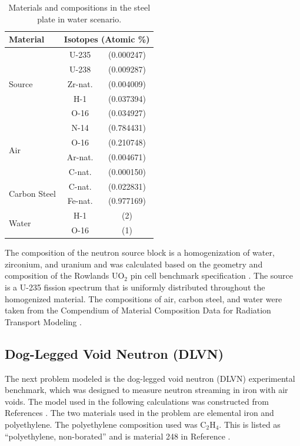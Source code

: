 \documentclass{article} %
\begin{document}
\begin{table}[!htb]
\centering
\caption{Materials and compositions in the steel plate in water scenario.}
\label{steel-mat}
\begin{tabular}{l|cc}
Material & \multicolumn{2}{c}{Isotopes (Atomic \%)} \\ \hline
\multirow{5}{*}{Source}   & U-235   & (0.000247) \\
                          & U-238   & (0.009287) \\
                          & Zr-nat. & (0.004009) \\
                          & H-1     & (0.037394) \\
                          & O-16    & (0.034927) \\ \hline
\multirow{4}{*}{Air}      & N-14    & (0.784431) \\
                          & O-16    & (0.210748) \\
                          & Ar-nat. & (0.004671) \\
                          & C-nat.  & (0.000150) \\ \hline
\multirow{2}{*}{Carbon Steel} & C-nat.  & (0.022831) \\
                              & Fe-nat. & (0.977169) \\ \hline
\multirow{2}{*}{Water}        & H-1     & (2)        \\
                              & O-16    & (1)        \\
\end{tabular}
\end{table}

The composition of the neutron source block is a homogenization of water,
zirconium, and uranium and was calculated based on the geometry and composition
of the Rowlands UO$_2$ pin cell benchmark specification \cite{pincell}. The
source is a U-235 fission 
spectrum that is uniformly distributed throughout the homogenized material. The
compositions of air, carbon steel, and water were taken from the Compendium of 
Material Composition Data for Radiation Transport Modeling \cite{pnnl}.

\subsection{Dog-Legged Void Neutron (DLVN)}

The next problem modeled is the dog-legged void neutron (DLVN) experimental 
benchmark, which was designed to measure neutron streaming in iron with air
voids. The model used in the following calculations was constructed from
References \cite{sw-dlvn,j-dlvn,dlvn1991}. The two materials used in the
problem are elemental iron and polyethylene. The polyethylene composition used
was C$_2$H$_4$. This is listed as ``polyethylene, non-borated'' and is material
248 in Reference \cite{pnnl}. 
\end{document}
